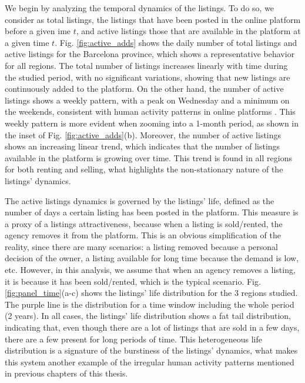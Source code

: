 We begin by analyzing the temporal dynamics of the listings. To do so, we consider as total listings, the listings that have been posted in the online platform before a given ime $t$, and active listings those that are available in the platform at a given time $t$. Fig. \ref{fig:active_adds} shows the daily number of total listings and active listings for the Barcelona province, which shows a representative behavior for all regions. The total number of listings increases linearly with time during the studied period, with no significant variations, showing that new listings are continuously added to the platform. On the other hand, the number of active listings shows a weekly pattern, with a peak on Wednesday and a minimum on the weekends, consistent with human activity patterns in online platforms \cite{szell2010multirelational}. This weekly pattern is more evident when zooming into a 1-month period, as shown in the inset of Fig. \ref{fig:active_adds}(b). Moreover, the number of active listings shows an increasing linear trend, which indicates that the number of listings available in the platform is growing over time. This trend is found in all regions for both renting and selling, what highlights the non-stationary nature of the listings' dynamics.

The active listings dynamics is governed by the listings' life, defined as the number of days a certain listing has been posted in the platform. This measure is a proxy of a listings attractiveness, because when a listing is sold/rented, the agency removes it from the platform. This is an obvious simplification of the reality, since there are many scenarios: a listing removed because a personal decision of the owner, a listing available for long time because the demand is low, etc. However, in this analysis, we assume that when an agency removes a listing, it is because it has been sold/rented, which is the typical scenario. Fig. \ref{fig:panel_time}(a-c) shows the listings' life distribution for the 3 regions studied. The purple line is the distribution for a time window including the whole period (2 years). In all cases, the listings' life distribution shows a fat tail distribution, indicating that, even though there are a lot of listings that are sold in a few days, there are a few present for long periods of time. This heterogeneous life distribution is a signature of the burstiness of the listings' dynamics, what makes this system another example of the irregular human activity patterns mentioned in previous chapters of this thesis.

